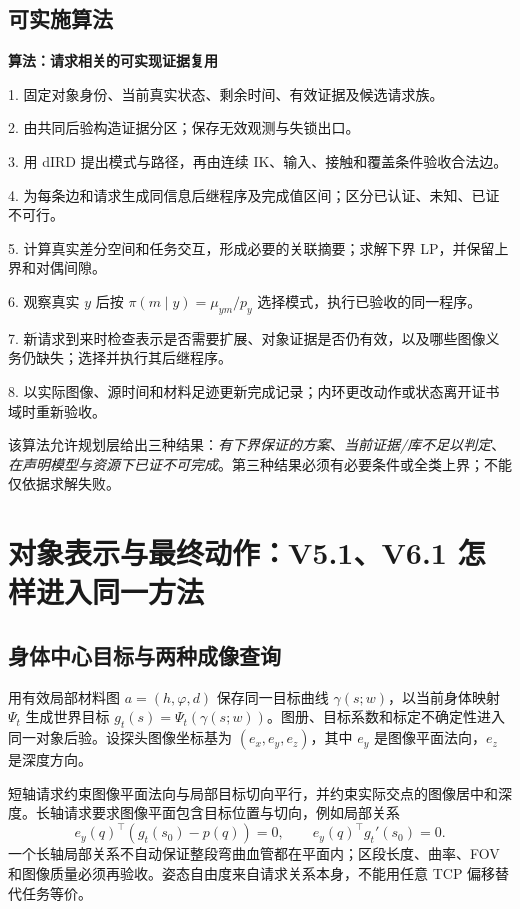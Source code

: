 \documentclass[UTF8,11pt,a4paper,fontset=fandol]{ctexart}
\numberwithin{equation}{section}
\theoremstyle{definition}
\begin{document}
\subsection{可实施算法}
\begin{keybox}
\textbf{算法：请求相关的可实现证据复用}\par
1. 固定对象身份、当前真实状态、剩余时间、有效证据及候选请求族。\par
2. 由共同后验构造证据分区；保存无效观测与失锁出口。\par
3. 用 dIRD 提出模式与路径，再由连续 IK、输入、接触和覆盖条件验收合法边。\par
4. 为每条边和请求生成同信息后继程序及完成值区间；区分已认证、未知、已证不可行。\par
5. 计算真实差分空间和任务交互，形成必要的关联摘要；求解下界 LP，并保留上界和对偶间隙。\par
6. 观察真实 $y$ 后按 $\pi(m\mid y)=\mu_{ym}/p_y$ 选择模式，执行已验收的同一程序。\par
7. 新请求到来时检查表示是否需要扩展、对象证据是否仍有效，以及哪些图像义务仍缺失；选择并执行其后继程序。\par
8. 以实际图像、源时间和材料足迹更新完成记录；内环更改动作或状态离开证书域时重新验收。
\end{keybox}

该算法允许规划层给出三种结果：\emph{有下界保证的方案}、\emph{当前证据/库不足以判定}、\emph{在声明模型与资源下已证不可完成}。第三种结果必须有必要条件或全类上界；不能仅依据求解失败。

\section{对象表示与最终动作：V5.1、V6.1 怎样进入同一方法}
\label{sec:backend}

\subsection{身体中心目标与两种成像查询}
用有效局部材料图 $a=(h,\varphi,d)$ 保存同一目标曲线 $\gamma(s;w)$，以当前身体映射 $\Psi_t$ 生成世界目标 $g_t(s)=\Psi_t(\gamma(s;w))$。图册、目标系数和标定不确定性进入同一对象后验。设探头图像坐标基为 $(e_x,e_y,e_z)$，其中 $e_y$ 是图像平面法向，$e_z$ 是深度方向。

短轴请求约束图像平面法向与局部目标切向平行，并约束实际交点的图像居中和深度。长轴请求要求图像平面包含目标位置与切向，例如局部关系
\begin{equation}
e_y(q)^\top(g_t(s_0)-p(q))=0,
\qquad e_y(q)^\top g_t'(s_0)=0.
\label{eq:LA}
\end{equation}
一个长轴局部关系不自动保证整段弯曲血管都在平面内；区段长度、曲率、FOV 和图像质量必须再验收。姿态自由度来自请求关系本身，不能用任意 TCP 偏移替代任务等价。
\end{document}
